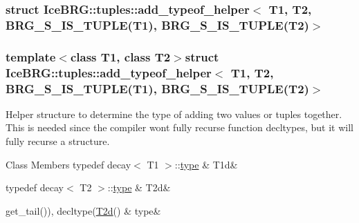 \subsubsection{struct Ice\+B\+R\+G\+:\+:tuples\+:\+:add\+\_\+typeof\+\_\+helper$<$ T1, T2, B\+R\+G\+\_\+\+S\+\_\+\+I\+S\+\_\+\+T\+U\+P\+L\+E(T1), B\+R\+G\+\_\+\+S\+\_\+\+I\+S\+\_\+\+T\+U\+P\+L\+E(T2)$>$}
\subsubsection*{template$<$class T1, class T2$>$struct Ice\+B\+R\+G\+::tuples\+::add\+\_\+typeof\+\_\+helper$<$ T1, T2, B\+R\+G\+\_\+\+S\+\_\+\+I\+S\+\_\+\+T\+U\+P\+L\+E(\+T1), B\+R\+G\+\_\+\+S\+\_\+\+I\+S\+\_\+\+T\+U\+P\+L\+E(\+T2)$>$}

Helper structure to determine the type of adding two values or tuples together. This is needed since the compiler won\textquotesingle{}t fully recurse function decltypes, but it will fully recurse a structure. \begin{DoxyFields}{Class Members}
\hypertarget{namespaceIceBRG_1_1tuples_ae86ef7e43c4c8a4f94a25646b71e3b7e}{}typedef decay$<$ T1 $>$\+::\hyperlink{namespaceIceBRG_1_1tuples_a8174c2af95d1a0d1dc44fff6d8c544e2}{type}\label{namespaceIceBRG_1_1tuples_ae86ef7e43c4c8a4f94a25646b71e3b7e}
&
T1d&
\\
\hline

\hypertarget{namespaceIceBRG_1_1tuples_a0d4426894c7f0b168a9e977776768c30}{}typedef decay$<$ T2 $>$\+::\hyperlink{namespaceIceBRG_1_1tuples_a8174c2af95d1a0d1dc44fff6d8c544e2}{type}\label{namespaceIceBRG_1_1tuples_a0d4426894c7f0b168a9e977776768c30}
&
T2d&
\\
\hline

\hypertarget{namespaceIceBRG_1_1tuples_a8174c2af95d1a0d1dc44fff6d8c544e2}{}get\+\_\+tail()), decltype(\hyperlink{namespaceIceBRG_1_1tuples_a0d4426894c7f0b168a9e977776768c30}{T2d}()\label{namespaceIceBRG_1_1tuples_a8174c2af95d1a0d1dc44fff6d8c544e2}
&
type&
\\
\hline

\end{DoxyFields}
\label{structIceBRG_1_1tuples_1_1add__typeof__helper_3_01T1_00_01T2_00_01BRG__S__IS__TUPLE_07T1_08_00_01BRG__S__NOT__TUPLE_07T2_08_4}
\hypertarget{namespaceIceBRG_1_1tuples_structIceBRG_1_1tuples_1_1add__typeof__helper_3_01T1_00_01T2_00_01BRG__S__IS__TUPLE_07T1_08_00_01BRG__S__NOT__TUPLE_07T2_08_4}{}
